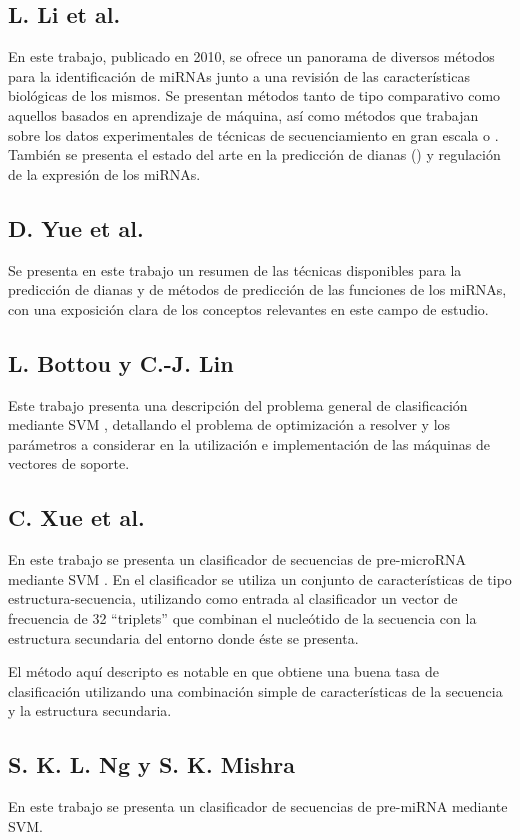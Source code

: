 \documentclass[12pt,bibliography=oldstyle,DIV=12,parskip=half-,titlepage]{scrartcl}
\begin{document}
\subsection{L. Li et al. \cite{lili}}
En este trabajo, publicado en 2010, se ofrece un panorama de diversos
métodos para la identificación de miRNAs junto a una revisión de las
características biológicas de los mismos. Se presentan métodos tanto
de tipo comparativo como aquellos basados en aprendizaje de máquina,
así como métodos que trabajan sobre los datos experimentales de
técnicas de secuenciamiento en gran escala o .
También se presenta el estado del arte en la predicción de dianas
() y regulación de la expresión de los miRNAs.
%
\subsection{D. Yue et al. \cite{yue}}
Se presenta en este trabajo un resumen de las técnicas disponibles
para la predicción de dianas y de métodos de predicción de las
funciones de los miRNAs, con una exposición clara de los conceptos
relevantes en este campo de estudio.
%
\subsection{L. Bottou y C.-J. Lin \cite{bottou}}
Este trabajo presenta una descripción del problema general de
clasificación mediante SVM \cite{svm}, detallando el problema de
optimización a resolver y los parámetros a considerar en la
utilización e implementación de las máquinas de vectores de soporte.
%
\subsection{C. Xue et al. \cite{xue}}
%
En este trabajo se presenta un clasificador de secuencias de
pre-microRNA mediante SVM \cite{svm}.  En el clasificador se utiliza
un conjunto de características de tipo estructura-secuencia,
utilizando como entrada al clasificador un vector de frecuencia de 32
``triplets'' que combinan el nucleótido de la secuencia con la
estructura secundaria del entorno donde éste se presenta.

El método aquí descripto es notable en que obtiene una buena tasa de
clasificación utilizando una combinación simple de características de
la secuencia y la estructura secundaria.
%
\subsection{S. K. L. Ng y S. K. Mishra \cite{ng}}
%
En este trabajo se presenta un clasificador de secuencias de
pre-miRNA mediante SVM.
\end{document}
